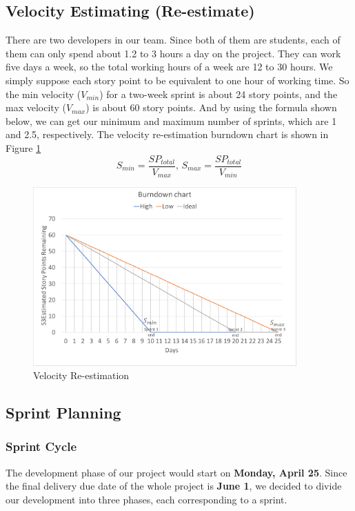 \documentclass{report}
\begin{document}
\subsection{Velocity Estimating (Re-estimate)}
There are two developers in our team. Since both of them are students, each of them can only spend about 1.2 to 3 hours a day on the project. They can work five days a week, so the total working hours of a week are 12 to 30 hours. We simply suppose each story point to be equivalent to one hour of working time. So the min velocity ($V_{min}$) for a two-week sprint is about 24 story points, and the max velocity ($V_{max}$) is about 60 story points. And by using the formula shown below, we can get our minimum and maximum number of sprints, which are 1 and 2.5, respectively. The velocity re-estimation burndown chart is shown in Figure \ref{fig:velocityEstimate}
$$
S_{min} = \frac{SP_{total}}{V_{max}}
\text{, } 
S_{max} = \frac{SP_{total}}{V_{min}}
$$
\begin{figure}[htp]
\centering
\includegraphics[width=0.9\textwidth]{Figures/velocityEstimate.pdf}
\caption{Velocity Re-estimation}
\label{fig:velocityEstimate}
\end{figure}

\clearpage
\subsection{Sprint Planning}
\subsubsection{Sprint Cycle}
\label{sec:sprintCycle}
The development phase of our project would start on \textbf{Monday, April 25}. Since the final delivery due date of the whole project is \textbf{June 1}, we decided to divide our development into three phases, each corresponding to a sprint.
\end{document}
